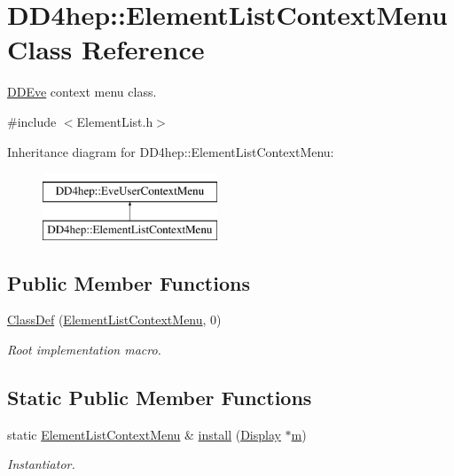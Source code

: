 \hypertarget{class_d_d4hep_1_1_element_list_context_menu}{}\section{D\+D4hep\+:\+:Element\+List\+Context\+Menu Class Reference}
\label{class_d_d4hep_1_1_element_list_context_menu}


\hyperlink{struct_d_d4hep_1_1_d_d_eve}{D\+D\+Eve} context menu class.  




{\ttfamily \#include $<$Element\+List.\+h$>$}

Inheritance diagram for D\+D4hep\+:\+:Element\+List\+Context\+Menu\+:\begin{figure}[H]
\begin{center}
\leavevmode
\includegraphics[height=2.000000cm]{class_d_d4hep_1_1_element_list_context_menu}
\end{center}
\end{figure}
\subsection*{Public Member Functions}
\begin{DoxyCompactItemize}
\item 
\hyperlink{class_d_d4hep_1_1_element_list_context_menu_ab60b3abac1f709147788e8de09e8aebb}{Class\+Def} (\hyperlink{class_d_d4hep_1_1_element_list_context_menu}{Element\+List\+Context\+Menu}, 0)
\begin{DoxyCompactList}\small\item\em Root implementation macro. \end{DoxyCompactList}\end{DoxyCompactItemize}
\subsection*{Static Public Member Functions}
\begin{DoxyCompactItemize}
\item 
static \hyperlink{class_d_d4hep_1_1_element_list_context_menu}{Element\+List\+Context\+Menu} \& \hyperlink{class_d_d4hep_1_1_element_list_context_menu_aa7cb9b95de9a2e5ff1b4a152de62cd79}{install} (\hyperlink{class_d_d4hep_1_1_display}{Display} $\ast$\hyperlink{_volumes_8cpp_a6fc379aaec47ce424b00d8ffda2a6c59}{m})
\begin{DoxyCompactList}\small\item\em Instantiator. \end{DoxyCompactList}\end{DoxyCompactItemize}
